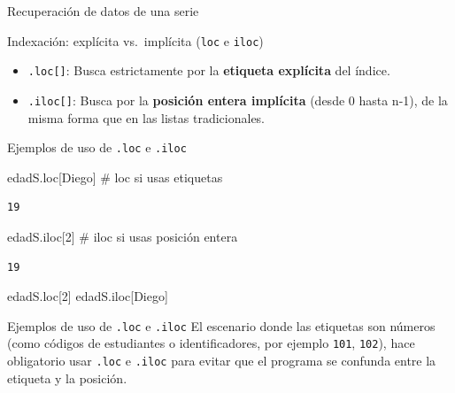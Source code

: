 \documentclass[
  ignorenonframetext,
  aspectratio=169,
  spanish,
]{beamer}
\newenvironment{Shaded}{\begin{snugshade}}{\end{snugshade}}
\newcommand{\CommentTok}[1]{\textcolor[rgb]{0.37,0.37,0.37}{#1}}
\newcommand{\DecValTok}[1]{\textcolor[rgb]{0.68,0.00,0.00}{#1}}
\newcommand{\NormalTok}[1]{\textcolor[rgb]{0.00,0.23,0.31}{#1}}
\newcommand{\StringTok}[1]{\textcolor[rgb]{0.13,0.47,0.30}{#1}}
\providecommand{\tightlist}{%
  \setlength{\itemsep}{0pt}\setlength{\parskip}{0pt}}
\begin{document}
\begin{frame}[fragile]{Recuperación de datos de una serie}
\begin{block}{Indexación: explícita vs.~implícita (\texttt{loc} e
\texttt{iloc})}
\begin{itemize}
  \begin{itemize}
  \tightlist
  \item
    \texttt{.loc{[}{]}}: Busca estrictamente por la \textbf{etiqueta
    explícita} del índice.
  \item
    \texttt{.iloc{[}{]}}: Busca por la \textbf{posición entera
    implícita} (desde 0 hasta n-1), de la misma forma que en las listas
    tradicionales.
  \end{itemize}
\end{itemize}
\end{block}

\begin{block}{Ejemplos de uso de \texttt{.loc} e \texttt{.iloc}}
\label{ejemplos-de-uso-de-.loc-e-.iloc}
\begin{Shaded}
\begin{Highlighting}[]
\NormalTok{edadS.loc[}\StringTok{\textquotesingle{}Diego\textquotesingle{}}\NormalTok{] }\CommentTok{\# loc si usas etiquetas }
\end{Highlighting}
\end{Shaded}

\begin{verbatim}
19
\end{verbatim}

\begin{Shaded}
\begin{Highlighting}[]
\NormalTok{edadS.iloc[}\DecValTok{2}\NormalTok{]   }\CommentTok{\# iloc si usas posición entera}
\end{Highlighting}
\end{Shaded}

\begin{verbatim}
19
\end{verbatim}

\begin{Shaded}
\begin{Highlighting}[]
\NormalTok{edadS.loc[}\DecValTok{2}\NormalTok{]  }
\NormalTok{edadS.iloc[}\StringTok{\textquotesingle{}Diego\textquotesingle{}}\NormalTok{]}
\end{Highlighting}
\end{Shaded}
\end{block}

\begin{block}{Ejemplos de uso de \texttt{.loc} e \texttt{.iloc}}
\label{ejemplos-de-uso-de-.loc-e-.iloc-1}
El escenario donde las etiquetas son números (como códigos de
estudiantes o identificadores, por ejemplo \texttt{101}, \texttt{102}),
hace obligatorio usar \texttt{.loc} e \texttt{.iloc} para evitar que el
programa se confunda entre la etiqueta y la posición.


\end{block}
\end{frame}
\end{document}
